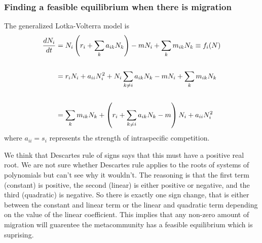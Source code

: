 \documentclass{article}
\begin{document}
\subsubsection*{Finding a feasible equilibrium when there is migration}
The generalized Lotka-Volterra model is
\begin{align}
\dfrac{dN_i}{dt} 
&= N_i\left(r_i+\sum_k a_{ik}N_k\right)-mN_i+\sum_k m_{ik}N_k \equiv f_i(N) \\
\notag\\
&=r_iN_i + a_{ii}N_i^2 + N_i\sum_{k\neq i} a_{ik}N_k - mN_i + \sum_k m_{ik} N_k \\
\notag\\
&=\sum_k m_{ik} N_k + \left(r_i + \sum_{k\neq i} a_{ik}N_k - m\right) N_i + a_{ii}N_i^2
\end{align}
where $a_{ii} = s_i$ represents the strength of intraspecific competition.

We think that Descartes rule of signs says that this must have a positive real root. We are not sure whether Descartes rule applies to the roots of systems of polynomials but can't see why it wouldn't. The reasoning is that the first term (constant) is positive, the second (linear) is either positive or negative, and the third (quadratic) is negative. So there is exactly one sign change, that is either between the constant and linear term or the linear and quadratic term depending on the value of the linear coefficient. This implies that any non-zero amount of migration will guarentee the metacommunity has a feasible equilibrium which is suprising. 
\end{document}

